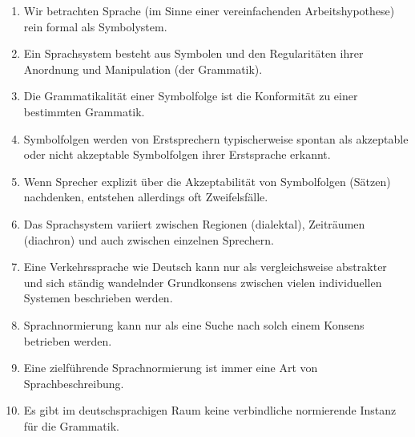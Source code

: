 \begin{enumerate}
  \item Wir betrachten Sprache (im Sinne einer vereinfachenden Arbeitshypothese) rein formal als Symbolystem.
  \item Ein Sprachsystem besteht aus Symbolen und den Regularitäten ihrer Anordnung und Manipulation (der Grammatik).
  \item Die Grammatikalität einer Symbolfolge ist die Konformität zu einer bestimmten Grammatik.
  \item Symbolfolgen werden von Erstsprechern typischerweise spontan als akzeptable oder nicht akzeptable Symbolfolgen ihrer Erstsprache erkannt.
  \item Wenn Sprecher explizit über die Akzeptabilität von Symbolfolgen (\zB Sätzen) nachdenken, entstehen allerdings oft Zweifelsfälle.
  \item Das Sprachsystem variiert zwischen Regionen (dialektal), Zeiträumen (diachron) und auch zwischen einzelnen Sprechern.
  \item Eine Verkehrssprache wie Deutsch kann nur als vergleichsweise abstrakter und sich ständig wandelnder Grundkonsens zwischen vielen individuellen Systemen beschrieben werden.
  \item Sprachnormierung kann nur als eine Suche nach solch einem Konsens betrieben werden.
  \item Eine zielführende Sprachnormierung ist immer eine Art von Sprachbeschreibung.
  \item Es gibt im deutschsprachigen Raum keine verbindliche normierende Instanz für die Grammatik.
\end{enumerate}
